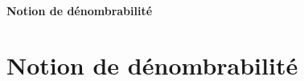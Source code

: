 \ifsolo
    ~

    \vspace{1cm}

    \begin{center}
        \textbf{\LARGE Notion de dénombrabilité} \\[1em]
    \end{center}
    \tableofcontents
\else
    \chapter{Notion de dénombrabilité}

    \minitoc
\fi
\thispagestyle{empty}
